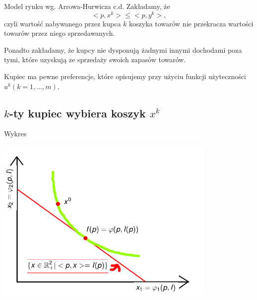 \documentclass[a4paper, 11pt]{beamer}
\begin{document}
      \begin{frame}{Model rynku wg. Arrowa-Hurwicza c.d.}
	Zakładamy, że
	\[ <p, x^k> \leq <p,y^k>, \]
	czyli wartość nabywanego przez kupca $k$ koszyka towarów nie przekracza
	wartości towarów przez niego sprzedawanych.

	\vskip10pt
	Ponadto zakładamy, że kupcy nie dysponują żadnymi innymi dochodami poza
	tymi, które uzyskują ze sprzedaży swoich zapasów towarów.

	\vskip10pt
	Kupiec ma pewne preferencje, które opisujemy przy użyciu funkcji
	użyteczności $u^k (k=1, \ldots, m)$.

      \end{frame}

    \subsection{$k$-ty kupiec wybiera koszyk $x^k$}

      \begin{frame}{Wykres}
	\begin{center}
	  \includegraphics[height=8cm]{wykres1.png}
	\end{center}
      \end{frame}
\end{document}
